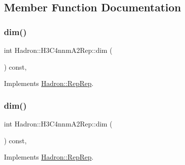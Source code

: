 \subsection{Member Function Documentation}
\mbox{\label{structHadron_1_1H3C4nnmA2Rep_a55f662581c05e8ebbc19e6dacf250f79}} 
\subsubsection{\texorpdfstring{dim()}{dim()}\hspace{0.1cm}{\footnotesize\ttfamily [1/5]}}
{\footnotesize\ttfamily int Hadron\+::\+H3\+C4nnm\+A2\+Rep\+::dim (\begin{DoxyParamCaption}{ }\end{DoxyParamCaption}) const\hspace{0.3cm}{\ttfamily [inline]}, {\ttfamily [virtual]}}



Implements \mbox{\hyperlink{structHadron_1_1RepRep_a92c8802e5ed7afd7da43ccfd5b7cd92b}{Hadron\+::\+Rep\+Rep}}.

\mbox{\label{structHadron_1_1H3C4nnmA2Rep_a55f662581c05e8ebbc19e6dacf250f79}} 
\subsubsection{\texorpdfstring{dim()}{dim()}\hspace{0.1cm}{\footnotesize\ttfamily [2/5]}}
{\footnotesize\ttfamily int Hadron\+::\+H3\+C4nnm\+A2\+Rep\+::dim (\begin{DoxyParamCaption}{ }\end{DoxyParamCaption}) const\hspace{0.3cm}{\ttfamily [inline]}, {\ttfamily [virtual]}}



Implements \mbox{\hyperlink{structHadron_1_1RepRep_a92c8802e5ed7afd7da43ccfd5b7cd92b}{Hadron\+::\+Rep\+Rep}}.

\mbox{\label{structHadron_1_1H3C4nnmA2Rep_a55f662581c05e8ebbc19e6dacf250f79}} 
